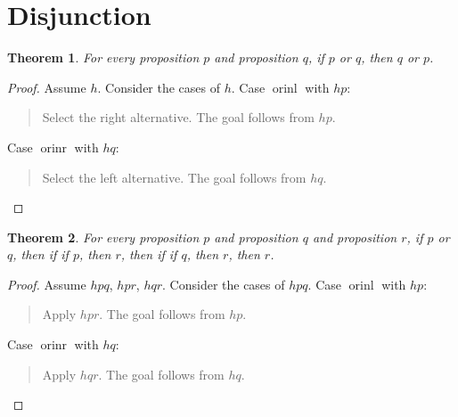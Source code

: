 \documentclass[11pt]{article}
\newtheorem{theorem}{Theorem}[section]
\theoremstyle{definition}
\begin{document}
\section{Disjunction}
\label{ll:main:disjunction}
\begin{theorem}
\label{ll:main:or-comm}
For every proposition \(p\) and proposition \(q\), if \(p\) or \(q\), then \(q\) or \(p\).
\end{theorem}
\begin{proof}
Assume \(h\).
Consider the cases of \(h\).
Case \(\operatorname{orinl}\) with \(hp\):
\begin{quote}
Select the right alternative.
The goal follows from \(hp\).
\end{quote}
Case \(\operatorname{orinr}\) with \(hq\):
\begin{quote}
Select the left alternative.
The goal follows from \(hq\).
\end{quote}
\end{proof}
\begin{theorem}
\label{ll:main:or-elim}
For every proposition \(p\) and proposition \(q\) and proposition \(r\), if \(p\) or \(q\), then if if \(p\), then \(r\), then if if \(q\), then \(r\), then \(r\).
\end{theorem}
\begin{proof}
Assume \(hpq\), \(hpr\), \(hqr\).
Consider the cases of \(hpq\).
Case \(\operatorname{orinl}\) with \(hp\):
\begin{quote}
Apply \(hpr\).
The goal follows from \(hp\).
\end{quote}
Case \(\operatorname{orinr}\) with \(hq\):
\begin{quote}
Apply \(hqr\).
The goal follows from \(hq\).
\end{quote}
\end{proof}
\end{document}
